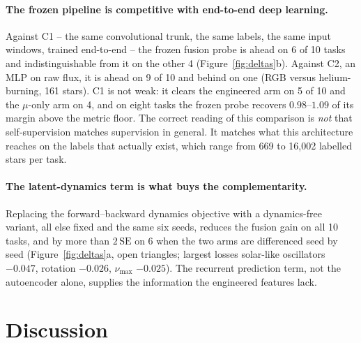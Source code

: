 \documentclass{article}
\begin{document}
\paragraph{The frozen pipeline is competitive with end-to-end deep learning.} Against C1 -- the same
convolutional trunk, the same labels, the same input windows, trained end-to-end -- the frozen fusion
probe is ahead on 6 of 10 tasks and indistinguishable from it on the other 4
(Figure~\ref{fig:deltas}b). Against
C2, an MLP on raw flux, it is ahead on 9 of 10 and behind on one (RGB versus helium-burning, 161
stars). C1 is not weak: it clears the engineered arm on 5 of 10 and the $\mu$-only arm on 4, and on
eight tasks the frozen probe recovers $0.98$--$1.09$ of its margin above the metric floor.
The correct reading of this comparison is
\emph{not} that self-supervision matches supervision in general. It matches what this architecture
reaches on the labels that actually exist, which range from 669 to 16{,}002 labelled stars per task.

\paragraph{The latent-dynamics term is what buys the complementarity.} Replacing the
forward--backward dynamics objective with a dynamics-free variant, all else fixed and the same six
seeds, reduces the fusion gain on all 10 tasks, and by more than $2\,\mathrm{SE}$ on 6 when the two
arms are differenced seed by seed (Figure~\ref{fig:deltas}a, open triangles; largest losses solar-like
oscillators $-0.047$, rotation $-0.026$, $\nu_{\max}$ $-0.025$). The recurrent prediction term, not
the autoencoder alone, supplies the information the engineered features lack.

\section{Discussion}
\end{document}

